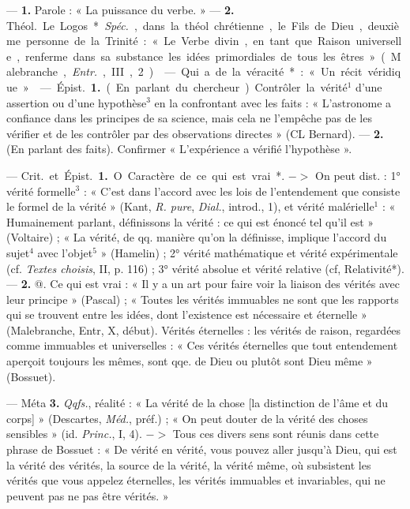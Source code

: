 \begin{itemize}[leftmargin=1cm, label=, itemsep=1pt]
 — {\bf 1.} Parole : « La puissance
du verbe. » —  {\bf 2.} \si{Théol.} Le Logos*.
{\it Spéc.}, dans la théol. chrétienne, le
Fils de Dieu, deuxième personne de
la Trinité : « Le Verbe divin, en tant
que Raison universelle, renferme
dans sa substance les idées primordiales de tous les êtres » (Malebranche, {\it Entr.}, III, 2).

 — Qui a de la véracité* :
« Un récit véridique. »

 — \si{Épist.} {\bf 1.} (En parlant du
chercheur). Contrôler la vérité$^1$ d’une
assertion ou d’une hypothèse$^3$ en
la confrontant avec les faits : « L’astronome a confiance dans les principes de sa science, mais cela ne
l'empêche pas de les vérifier et de
les contrôler par des observations
directes » (CL Bernard). —  {\bf 2.} (En
parlant des faits). Confirmer
« L'expérience a vérifié l’hypothèse ».

 — \si{Crit.} et \si{Épist.} {\bf 1.} O. Caractère de ce qui est vrai*. $->$ On
peut dist. : 1° vérité formelle$^3$ :
« C’est dans l’accord avec les lois
de l’entendement que consiste le
formel de la vérité » (Kant, {\it R. pure},
{\it Dial.}, introd., 1), et vérité malérielle$^1$ : « Humainement parlant,
définissons la vérité : ce qui est
énoncé tel qu'il est » (Voltaire) ;
« La vérité, de qq. manière qu’on la
définisse, implique l'accord du sujet$^4$
avec l’objet$^5$ » (Hamelin) ; 2° vérité
mathématique et vérité expérimentale (cf. {\it Textes choisis}, II, p. 116) ;
3° vérité absolue et vérité relative
(cf, Relativité*). —  {\bf 2.} @. Ce qui est
vrai : « Il y a un art pour faire voir
la liaison des vérités avec leur principe » (Pascal) ; « Toutes les vérités
immuables ne sont que les rapports
qui se trouvent entre les idées, dont
l'existence est nécessaire et éternelle » (Malebranche, Entr, X,
début). Vérités éternelles : les vérités
de raison, regardées comme immuables et universelles : « Ces vérités
éternelles que tout entendement
aperçoit toujours les mêmes, sont
qqe. de Dieu ou plutôt sont Dieu
même » (Bossuet).

— Méta  {\bf 3.} {\it Qqfs.}, réalité : « La
vérité de la chose [la distinction de
l’âme et du corps] » (Descartes,
\si{{\it Méd.}}, préf.) ; « On peut douter de la
vérité des choses sensibles » (id.
{\it Princ.}, I, 4). $->$ Tous ces divers
sens sont réunis dans cette phrase
de Bossuet : « De vérité en vérité,
vous pouvez aller jusqu'à Dieu,
qui est la vérité des vérités, la source
de la vérité, la vérité même, où subsistent les vérités que vous appelez
éternelles, les vérités immuables et
invariables, qui ne peuvent pas ne
pas être vérités. »


\end{itemize}
